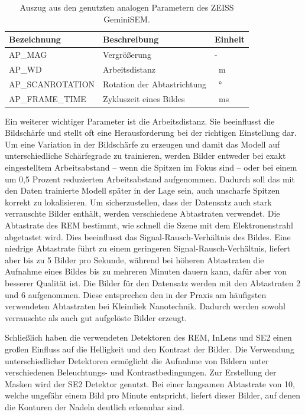 \begin{table}[h]
\begin{center}
\begin{tabular}{lll}
\toprule
Bezeichnung&Beschreibung&Einheit\\
\midrule
AP\_MAG&Vergrößerung&-\\
AP\_WD&Arbeitsdistanz&\SI{}{\metre}\\
AP\_SCANROTATION&Rotation der Abtastrichtung&\SI{}{\degree}\\
AP\_FRAME\_TIME&Zykluszeit eines Bildes&\SI{}{\milli\second}\\
\bottomrule
\end{tabular}
\end{center}
\caption{Auszug aus den genutzten analogen Parametern des ZEISS GeminiSEM.}
\label{tab:AP_Parameter}
\begin{small}
\end{small}
\end{table}
Ein weiterer wichtiger Parameter ist die Arbeitsdistanz. Sie beeinflusst die Bildschärfe und stellt oft eine Herausforderung bei der richtigen Einstellung dar. Um eine Variation in der Bildschärfe zu erzeugen und damit das Modell auf unterschiedliche Schärfegrade zu trainieren, werden Bilder entweder bei exakt eingestelltem Arbeitsabstand – wenn die Spitzen im Fokus sind – oder bei einem um 0,5 Prozent reduzierten Arbeitsabstand aufgenommen. Dadurch soll das mit den Daten trainierte Modell später in der Lage sein, auch unscharfe Spitzen korrekt zu lokalisieren.
\newpage
Um sicherzustellen, dass der Datensatz auch stark verrauschte Bilder enthält, werden verschiedene Abtastraten verwendet. Die Abtastrate des REM bestimmt, wie schnell die Szene mit dem Elektronenstrahl abgetastet wird. Dies beeinflusst das Signal-Rausch-Verhältnis des Bildes. Eine niedrige Abtastrate führt zu einem geringeren Signal-Rausch-Verhältnis, liefert aber bis zu 5 Bilder pro Sekunde, während bei höheren Abtastraten die Aufnahme eines Bildes bis zu mehreren Minuten dauern kann, dafür aber von besserer Qualität ist. Die Bilder für den Datensatz werden mit den Abtastraten 2 und 6 aufgenommen. Diese entsprechen den in der Praxis am häufigsten verwendeten Abtastraten bei Kleindiek Nanotechnik. Dadurch werden sowohl verrauschte als auch gut aufgelöste Bilder erzeugt.

Schließlich haben die verwendeten Detektoren des REM, InLens und SE2 einen großen Einfluss auf die Helligkeit und den Kontrast der Bilder. Die Verwendung unterschiedlicher Detektoren ermöglicht die Aufnahme von Bildern unter verschiedenen Beleuchtungs- und Kontrastbedingungen.
Zur Erstellung der Masken wird der SE2 Detektor genutzt. Bei einer langsamen Abtastrate von 10, welche ungefähr einem Bild pro Minute entspricht, liefert dieser Bilder, auf denen die Konturen der Nadeln deutlich erkennbar sind.

